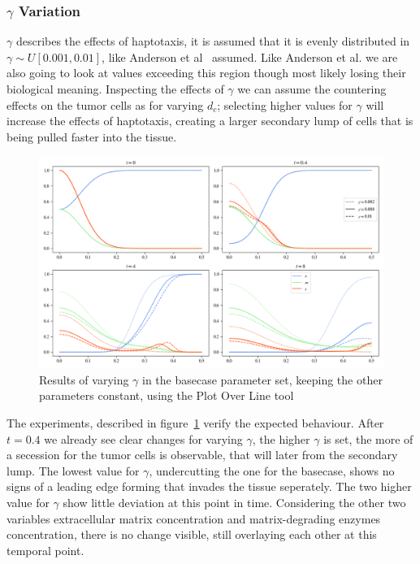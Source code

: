 \subsubsection*{$\gamma$ Variation}
$\gamma$ describes the effects of haptotaxis, it is assumed that it is evenly distributed in $\gamma \sim U[0.001,0.01]$, like Anderson et al~\cite{anderson_mathematical_2000} assumed. Like Anderson et al. we are also going to look at values exceeding this region though most likely losing their biological meaning. Inspecting the effects of $\gamma$ we can assume the countering effects on the tumor cells as for varying $d_c$; selecting higher values for $\gamma$ will increase the effects of haptotaxis, creating a larger secondary lump of cells that is being pulled faster into the tissue.
\begin{figure}[h]
    \centering
    \includegraphics[width=\textwidth]{resources/images/gamma_variation.png}
    \caption{Results of varying $\gamma$ in the basecase parameter set, keeping the other parameters constant, using the Plot Over Line tool}
    \label{fig:gamma_variation}
\end{figure}
The experiments, described in figure~\ref{fig:gamma_variation} verify the expected behaviour. After $t=0.4$ we already see clear changes for varying $\gamma$, the higher $\gamma$ is set, the more of a secession for the tumor cells is observable, that will later from the secondary lump. The lowest value for $\gamma$, undercutting the one for the basecase, shows no signs of a leading edge forming that invades the tissue seperately. The two higher value for $\gamma$ show little deviation at this point in time. Considering the other two variables extracellular matrix concentration and matrix-degrading enzymes concentration, there is no change visible, still overlaying each other at this temporal point.\newline 
